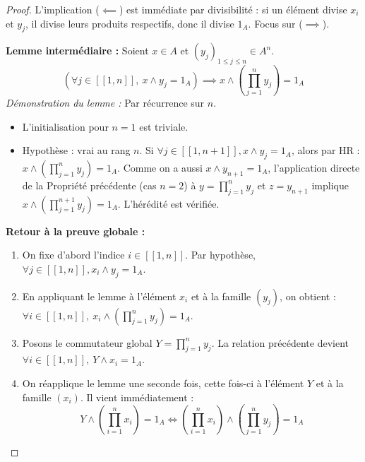 \documentclass[12pt, a4paper]{report}
\begin{document}
\begin{proof}
    L'implication ($\impliedby$) est immédiate par divisibilité : si un élément divise $x_i$ et $y_j$, il divise leurs produits respectifs, donc il divise $1_A$. Focus sur ($\implies$).

    \textbf{Lemme intermédiaire :} Soient $x \in A$ et $(y_j)_{1 \le j \le n} \in A^n$.
    \[ \left(\forall j \in [\![ 1, n ]\!], \ x \wedge y_j = 1_A\right) \implies x \wedge \left(\prod_{j=1}^n y_j\right) = 1_A \]
    \textit{Démonstration du lemme :} Par récurrence sur $n$.
    \begin{itemize}
        \item L'initialisation pour $n=1$ est triviale.
        \item Hypothèse : vrai au rang $n$. Si $\forall j \in [\![ 1, n+1 ]\!], x \wedge y_j = 1_A$, alors par HR : $x \wedge (\prod_{j=1}^n y_j) = 1_A$. Comme on a aussi $x \wedge y_{n+1} = 1_A$, l'application directe de la Propriété précédente (cas $n=2$) à $y = \prod_{j=1}^n y_j$ et $z = y_{n+1}$ implique $x \wedge (\prod_{j=1}^{n+1} y_j) = 1_A$. L'hérédité est vérifiée.
    \end{itemize}

    \textbf{Retour à la preuve globale :}
    \begin{enumerate}
        \item On fixe d'abord l'indice $i \in [\![ 1, n ]\!]$. Par hypothèse, $\forall j \in [\![ 1, n ]\!], x_i \wedge y_j = 1_A$.
        \item En appliquant le lemme à l'élément $x_i$ et à la famille $(y_j)$, on obtient : $\forall i \in [\![ 1, n ]\!], \ x_i \wedge \left(\prod_{j=1}^n y_j\right) = 1_A$.
        \item Posons le commutateur global $Y = \prod_{j=1}^n y_j$. La relation précédente devient $\forall i \in [\![ 1, n ]\!], \ Y \wedge x_i = 1_A$.
        \item On réapplique le lemme une seconde fois, cette fois-ci à l'élément $Y$ et à la famille $(x_i)$. Il vient immédiatement :
        \[ Y \wedge \left(\prod_{i=1}^n x_i\right) = 1_A \iff \left(\prod_{i=1}^n x_i\right) \wedge \left(\prod_{j=1}^n y_j\right) = 1_A \]
    \end{enumerate}
\end{proof}
\end{document}
